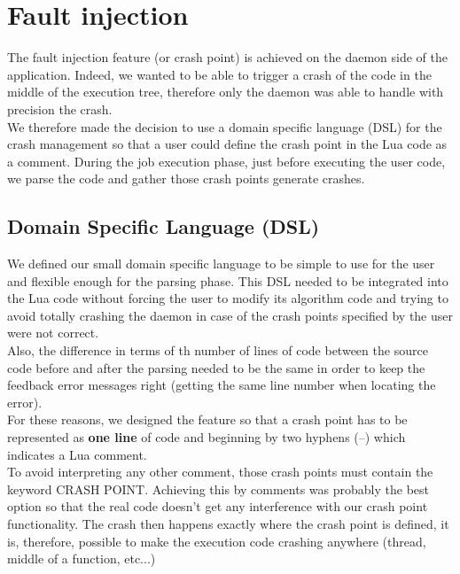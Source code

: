 \documentclass{eplmastersthesis}
\begin{document}
    \section{Fault injection}

      The fault injection feature (or crash point) is achieved on the daemon
      side of the application. Indeed, we wanted to be able to trigger a crash
      of the code in the middle of the execution tree, therefore only the
      daemon was able to handle with precision the crash.\\

      We therefore made the decision to use a domain specific language (DSL)
      for the crash management so that a user could define the crash point
      in the Lua code as a comment. During the job execution phase, just before
      executing the user code, we parse the code and gather those crash
      points generate crashes.

      \subsection{Domain Specific Language (DSL)}

        We defined our small domain specific language to be simple to use
        for the user and flexible enough for the parsing phase. This DSL
        needed to be integrated into the Lua code without forcing the user to
        modify its algorithm code and trying to avoid totally crashing
        the daemon in case of the crash points specified by the user were
        not correct.\\
        Also, the difference in terms of th number of lines of code between the
        source code before and after the parsing needed to be the same in
        order to keep the feedback error messages right (getting the same line
        number when locating the error).\\

        For these reasons, we designed the feature so that a crash point has
        to be represented as \textbf{one line} of code and beginning by
        two hyphens (--) which indicates a Lua comment.\\
        To avoid interpreting any other comment, those crash points must
        contain the keyword \textsc{CRASH POINT}. Achieving this by comments
        was probably the best option so that the real code doesn't get any
        interference with our crash point functionality. The crash then
        happens exactly where the crash point is defined, it is, therefore,
        possible to make the execution code crashing anywhere (thread, middle
        of a function, etc...)\\
\end{document}
